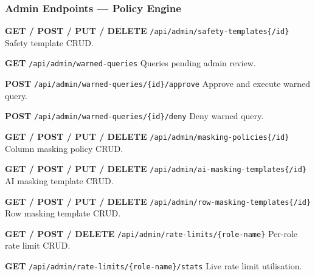 \subsubsection{Admin Endpoints — Policy Engine}

\begin{tcolorbox}[colback=orange!5, colframe=orange!50, title=\textbf{Safety Templates, Masking, and Rate Limits}]

\textbf{GET / POST / PUT / DELETE} \texttt{/api/admin/safety-templates\{/id\}} \quad Safety template CRUD.

\vspace{0.2cm}

\textbf{GET} \texttt{/api/admin/warned-queries} \quad Queries pending admin review.

\vspace{0.2cm}

\textbf{POST} \texttt{/api/admin/warned-queries/\{id\}/approve} \quad Approve and execute warned query.

\vspace{0.2cm}

\textbf{POST} \texttt{/api/admin/warned-queries/\{id\}/deny} \quad Deny warned query.

\vspace{0.2cm}

\textbf{GET / POST / PUT / DELETE} \texttt{/api/admin/masking-policies\{/id\}} \quad Column masking policy CRUD.

\vspace{0.2cm}

\textbf{GET / POST / PUT / DELETE} \texttt{/api/admin/ai-masking-templates\{/id\}} \quad AI masking template CRUD.

\vspace{0.2cm}

\textbf{GET / POST / PUT / DELETE} \texttt{/api/admin/row-masking-templates\{/id\}} \quad Row masking template CRUD.

\vspace{0.2cm}

\textbf{GET / POST / DELETE} \texttt{/api/admin/rate-limits/\{role-name\}} \quad Per-role rate limit CRUD.

\vspace{0.2cm}

\textbf{GET} \texttt{/api/admin/rate-limits/\{role-name\}/stats} \quad Live rate limit utilisation.

\end{tcolorbox}

